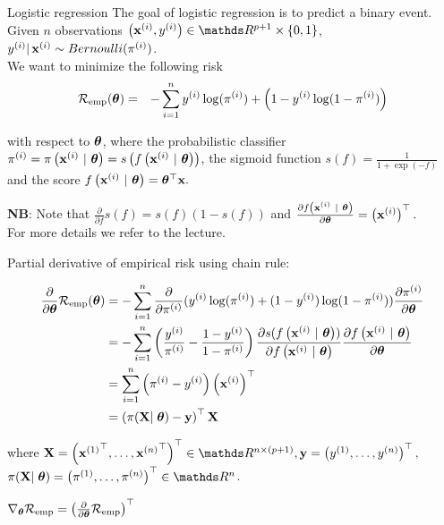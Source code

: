 \documentclass[11pt,compress,t,notes=noshow, xcolor=table]{beamer}
\begin{document}
\begin{vbframe}{Logistic regression}
The goal of logistic regression is to predict a binary event.
Given $n$ observations $\left(\xi, \yi\right) \in \R^{p+1} \times \{0, 1\}$,
$y^{(i)} |\, \mathbf{x}^{(i)} \sim Bernoulli(\pi^{(i)})$.\\
\lz
We want to minimize the following risk 
\begin{eqnarray*}
  \mathcal{R}_{\text{emp}}(\bm{\theta})  & = & 
  -\sum^n_{i=1} y^{(i)}\log(\pi^{(i)}) + \left(1-y^{(i)}\log(1-\pi^{(i)})\right)
\end{eqnarray*}

with respect to $\bm{\theta}$, 
where the probabilistic classifier $\pi^{(i)} = \pi\left(\mathbf{x}^{(i)} ~|~ \bm{\theta}\right) = s\left(f\left(\mathbf{x}^{(i)} ~|~ \bm{\theta}\right)\right)$,
the sigmoid function $s(f) = \frac{1}{1 + \exp(-f)}$ and the score $f\left(\mathbf{x}^{(i)} ~|~ \bm{\theta}\right) = \bm{\theta}^\top \mathbf{x}.$\\
\lz

\textbf{NB}: Note that $\frac{\partial}{\partial f} s(f) = s(f)(1-s(f))$ and $\frac{\partial f\left(\mathbf{x}^{(i)} ~|~ \bm{\theta}\right)}{\partial \bm{\theta}} = \left(\mathbf{x}^{(i)}\right)^\top.$\\
\vspace{0.3cm}
For more details we refer to the \href{https://slds-lmu.github.io/i2ml/chapters/11_advriskmin/}{\color{blue}{i2ml}} lecture.

\framebreak
Partial derivative of empirical risk using chain rule:

{\small
\begin{align*}
  \frac{\partial}{\partial\bm{\theta}}\mathcal{R}_{\text{emp}}(\bm{\theta}) 
& =  
 -\sum\limits_{i=1}^n \frac{\partial}{\partial\pi^{(i)} }(y^{(i)}\log(\pi^{(i)})+(1-y^{(i)})\log(1-\pi^{(i)}))\frac{\partial\pi^{(i)}}{\partial \bm{\theta}} \\
& =  
  -\sum\limits_{i=1}^n \left(\frac{y^{(i)}}{\pi^{(i)}} -  \frac{1-y^{(i)}}{1-\pi^{(i)}}\right)\frac{\partial s(f\left(\mathbf{x}^{(i)} ~|~ \bm{\theta}\right))}{\partial  f\left(\mathbf{x}^{(i)} ~|~ \bm{\theta}\right)}\frac{\partial  f\left(\mathbf{x}^{(i)} ~|~ \bm{\theta}\right)}{\partial\bm{\theta}}\\
& = 
  \sum\limits_{i=1}^n \left(\pi^{(i)} - y^{(i)}\right)\left(\mathbf{x}^{(i)}\right)^\top\\
& = 
  \left(\pi(\mathbf{X}\vert\;\bm{\theta}) - \mathbf{y}\right)^\top\mathbf{X}\\
\end{align*}
}

where  $\mathbf{X} = \left(
    {\xi[1]}^{\top}, \dots, 
    {\xi[n]}^{\top}\right)^\top \in \R^{n\times (p+1)}, \mathbf{y} = \left(
    \yi[1], \dots,
    \yi[n]
\right)^\top,$ \\ $\pi(\mathbf{X}\vert\;\thetav) = \left(
    \pi^{(1)}, \dots,
    \pi^{(n)}
\right)^\top \in \R^{n}$.

$\nabla_{\bm{\theta}}\mathcal{R}_{\text{emp}} = \left(\frac{\partial}{\partial\bm{\theta}}\mathcal{R}_{\text{emp}}\right)^\top$


\end{vbframe}
\end{document}
